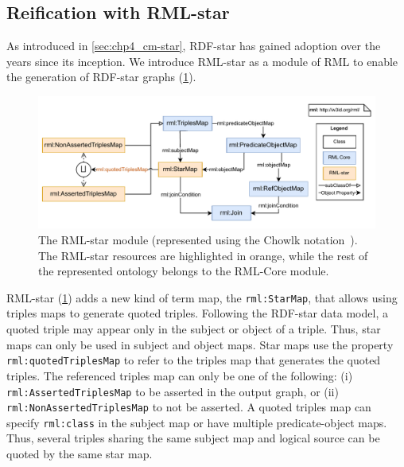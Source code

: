 

\subsection{Reification with RML-star}
\label{sec:chp4_reif_mappings}

As introduced in \cref{sec:chp4_cm-star}, RDF-star has gained adoption over the years since its inception. We introduce RML-star as a module of RML to enable the generation of \mbox{RDF-star} graphs (\cref{fig:chp4-3_rml-star}). 


\begin{figure}[!t]
\centering
\includegraphics[width=1\linewidth]{figures/chp4-3_rml-star_diagram.pdf}
\caption[RML-star module]{The \mbox{RML-star} module (represented using the Chowlk notation~\parencite{feria2022chowlk}). The RML-star resources are highlighted in orange, while the rest of the represented ontology belongs to the RML-Core module.}
\label{fig:chp4-3_rml-star}
\end{figure}

\mbox{RML-star} (\cref{fig:chp4-3_rml-star}) adds a new kind of term map, the \texttt{rml:StarMap}, that allows using triples maps to generate quoted triples. 
Following the \mbox{RDF-star} data model,
a quoted triple may appear only in the subject or object of a triple.
Thus, star maps can only be used in subject and object maps.
Star maps use the property \texttt{rml:quotedTriplesMap} to refer to the triples map that generates the quoted triples. 
The referenced triples map can only be one of the following: (i) \texttt{rml:AssertedTriplesMap} to be asserted in the output graph, or (ii) \texttt{rml:NonAssertedTriplesMap} to not be asserted. A quoted triples map can specify \texttt{rml:class} in the subject map or have multiple predicate-object maps.
Thus, several triples sharing the same subject map and logical source can be quoted by the same star map.








